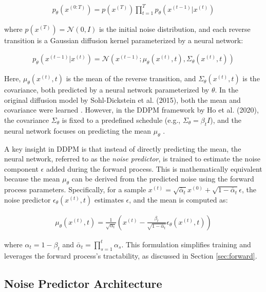 \documentclass[12pt]{article}
\begin{document}
\begin{align}
p_\theta(x^{(0:T)}) = p(x^{(T)}) \prod_{t=1}^{T} p_\theta(x^{(t-1)} | x^{(t)})
\end{align}

where \( p(x^{(T)}) = \mathcal{N}(0, I) \) is the initial noise distribution, and each reverse transition is a Gaussian diffusion kernel parameterized by a neural network:

\begin{align}
p_\theta(x^{(t-1)} | x^{(t)}) = \mathcal{N}(x^{(t-1)}; \mu_\theta(x^{(t)}, t), \Sigma_\theta(x^{(t)}, t))
\end{align}

Here, \( \mu_\theta(x^{(t)}, t) \) is the mean of the reverse transition, and \( \Sigma_\theta(x^{(t)}, t) \) is the covariance, both predicted by a neural network parameterized by \( \theta \). In the original diffusion model by Sohl-Dickstein et al. (2015), both the mean and covariance were learned \cite{sohl2015}. However, in the DDPM framework by Ho et al. (2020), the covariance \( \Sigma_\theta \) is fixed to a predefined schedule (e.g., \( \Sigma_\theta = \beta_t I \)), and the neural network focuses on predicting the mean \( \mu_\theta \) \cite{ho2020}.

A key insight in DDPM is that instead of directly predicting the mean, the neural network, referred to as the \emph{noise predictor}, is trained to estimate the noise component \( \epsilon \) added during the forward process. This is mathematically equivalent because the mean \( \mu_\theta \) can be derived from the predicted noise using the forward process parameters. Specifically, for a sample \( x^{(t)} = \sqrt{\bar{\alpha}_t} x^{(0)} + \sqrt{1 - \bar{\alpha}_t} \epsilon \), the noise predictor \( \epsilon_\theta(x^{(t)}, t) \) estimates \( \epsilon \), and the mean is computed as:

\begin{align}
\mu_\theta(x^{(t)}, t) = \frac{1}{\sqrt{\alpha_t}} \left( x^{(t)} - \frac{\beta_t}{\sqrt{1 - \bar{\alpha}_t}} \epsilon_\theta(x^{(t)}, t) \right)
\end{align}

where \( \alpha_t = 1 - \beta_t \) and \( \bar{\alpha}_t = \prod_{s=1}^{t} \alpha_s \). This formulation simplifies training and leverages the forward process’s tractability, as discussed in Section \ref{sec:forward}.


\subsection{Noise Predictor Architecture}
\label{subsec:noise_predictor}
\end{document}
